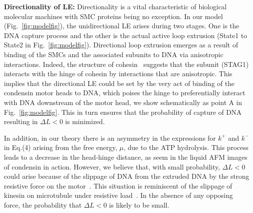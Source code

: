 \documentclass[fleqn,10pt]{wlscirep}
\begin{document}

{\bf Directionality of LE:}
Directionality is a vital characteristic of biological molecular machines with SMC proteins being no exception. In our model (Fig.~\ref{fig:modelfig}), the unidirectional LE arises during two stages. One is the DNA capture process and the other is the actual active loop extrusion  (State1 to State2 in Fig.~\ref{fig:modelfig}). Directional loop extrusion  emerges as a result of binding  of the SMCs and the associated subunits to DNA via anisotropic interactions. Indeed, the structure of cohesin~\cite{shi2020cryo} suggests that the subunit (STAG1) interacts with the hinge of cohesin by interactions that are anisotropic. This implies that the directional LE could be set by the very act of binding of the condensin motor heads to DNA, which poises the hinge to preferentially interact with  DNA downstream of the motor head, we show schematically as point A in Fig.~\ref{fig:modelfig}.  This in turn ensures  that  the probability of capture of DNA resulting in $\Delta L <0$ is minimized. 

In addition, in our theory there is an asymmetry in the expressions for $k^+$ and $k^-$ in Eq.(4) arising from the free energy, $\mu$, due to the ATP hydrolysis. This process leads to a decrease in the head-hinge distance, as seem in the liquid AFM  images of condensin in action.   However, we believe that, with small probability, $\Delta L<0$ could arise because of the slippage of DNA from the extruded DNA by the strong resistive force on the motor~\cite{ryu2020resolving}. This situation is reminiscent of the slippage of kinesin on microtubule under resistive load~\cite{sudhakar2021germanium}. In the absence of any opposing force, the probability that $\Delta L<0$ is likely to be small.
\end{document}

